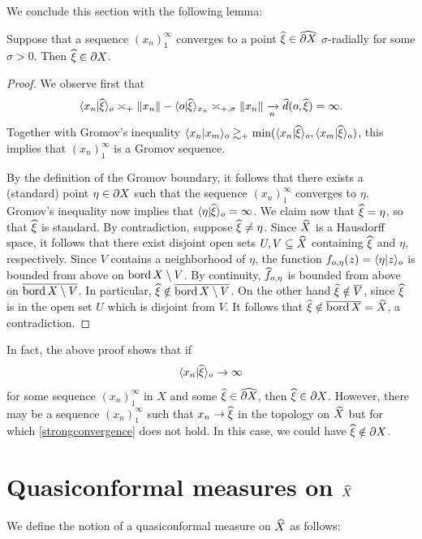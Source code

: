 We conclude this section with the following lemma:

\begin{lemma}
\label{lemmaradialstandard}
Suppose that a sequence $(x_n)_1^\infty$ converges to a point $\xihat\in\what{\del X}$ $\sigma$-radially for some $\sigma > 0$. Then $\xihat\in\del X$.
\end{lemma}
\begin{proof}
We observe first that
\[
\lb x_n|\xihat\rb_\zero \asymp_\plus \dox{x_n} - \lb \zero|\xihat\rb_{x_n} \asymp_{\plus,\sigma} \dox{x_n} \tendsto n \dhat(\zero,\xihat) = \infty.
\]
Together with Gromov's inequality $\lb x_n|x_m\rb_\zero \gtrsim_\plus \min(\lb x_n|\xihat\rb_\zero,\lb x_m|\xihat\rb_\zero)$, this implies that $(x_n)_1^\infty$ is a Gromov sequence.

By the definition of the Gromov boundary, it follows that there exists a (standard) point $\eta\in\partial X$ such that the sequence $(x_n)_1^\infty$ converges to $\eta$. Gromov's inequality now implies that $\lb \eta|\xihat\rb_\zero = \infty$. We claim now that $\xihat = \eta$, so that $\xihat$ is standard. By contradiction, suppose $\xihat\neq\eta$. Since $\widehat X$ is a Hausdorff space, it follows that there exist disjoint open sets $U,V\subseteq\widehat X$ containing $\xihat$ and $\eta$, respectively. Since $V$ contains a neighborhood of $\eta$, the function $f_{o,\eta}(z) = \langle \eta|z\rangle_o$ is bounded from above on $\operatorname{bord} X\setminus V$. By continuity, $\fhat_{\zero,\eta}$ is bounded from above on $\overline{\operatorname{bord} X\setminus V}$. In particular, $\xihat\notin \cl{\bord X\butnot V}$. On the other hand $\xihat\notin \cl V$, since $\xihat$ is in the open set $U$ which is disjoint from $V$. It follows that $\xihat\notin \cl{\bord X} = \what X$, a contradiction.
\end{proof}
\begin{remark}
\label{remarkradialstandard}
In fact, the above proof shows that if
\begin{equation}
\label{strongconvergence}
\lb x_n|\xihat\rb_\zero \to \infty
\end{equation}
for some sequence $(x_n)_1^\infty$ in $X$ and some $\xihat\in\what{\del X}$, then $\xihat\in\del X$. However, there may be a sequence $(x_n)_1^\infty$ such that $x_n\to \xihat$ in the topology on $\widehat X$ but for which \eqref{strongconvergence} does not hold. In this case, we could have $\xihat\notin\del X$.
\end{remark}

\section{Quasiconformal measures on $\widehat X$}
We define the notion of a quasiconformal measure on $\widehat X$ as follows:

